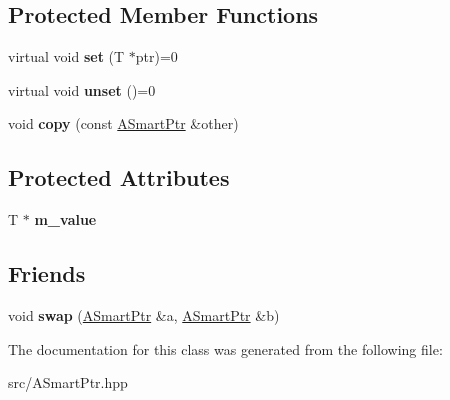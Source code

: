 \subsection*{Protected Member Functions}
\begin{DoxyCompactItemize}
\item 
\mbox{\label{classathome_1_1utility_1_1memory_1_1_a_smart_ptr_aa95305dd5cda4b536c46a8b245594884}} 
virtual void {\bfseries set} (T $\ast$ptr)=0
\item 
\mbox{\label{classathome_1_1utility_1_1memory_1_1_a_smart_ptr_abfa9b7d5df2d4d0f7c71666cf9734531}} 
virtual void {\bfseries unset} ()=0
\item 
\mbox{\label{classathome_1_1utility_1_1memory_1_1_a_smart_ptr_a318500c88506c71d21c2a6e3f42271cc}} 
void {\bfseries copy} (const \mbox{\hyperlink{classathome_1_1utility_1_1memory_1_1_a_smart_ptr}{A\+Smart\+Ptr}} \&other)
\end{DoxyCompactItemize}
\subsection*{Protected Attributes}
\begin{DoxyCompactItemize}
\item 
\mbox{\label{classathome_1_1utility_1_1memory_1_1_a_smart_ptr_a9ae23b0d50c8b856f7d8dbcf67d8e9bd}} 
T $\ast$ {\bfseries m\+\_\+value}
\end{DoxyCompactItemize}
\subsection*{Friends}
\begin{DoxyCompactItemize}
\item 
\mbox{\label{classathome_1_1utility_1_1memory_1_1_a_smart_ptr_a9dafb7972f91a3efb0c60fb975ed7fa1}} 
void {\bfseries swap} (\mbox{\hyperlink{classathome_1_1utility_1_1memory_1_1_a_smart_ptr}{A\+Smart\+Ptr}} \&a, \mbox{\hyperlink{classathome_1_1utility_1_1memory_1_1_a_smart_ptr}{A\+Smart\+Ptr}} \&b)
\end{DoxyCompactItemize}


The documentation for this class was generated from the following file\+:\begin{DoxyCompactItemize}
\item 
src/A\+Smart\+Ptr.\+hpp\end{DoxyCompactItemize}
